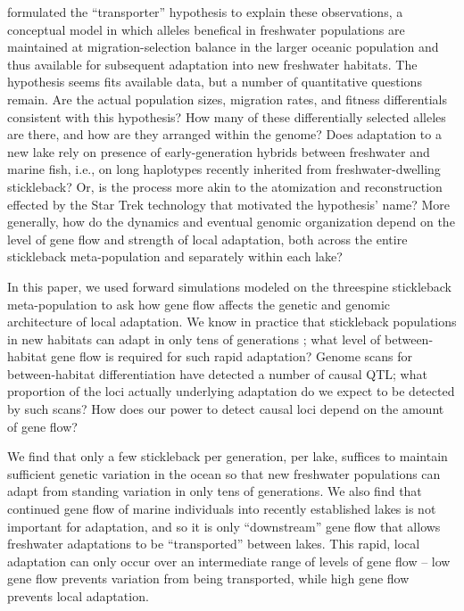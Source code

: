\documentclass{article}
\begin{document}
\citet{schluter2009genetics} formulated the ``transporter'' hypothesis to explain these observations,
a conceptual model in which alleles benefical in freshwater populations
are maintained at migration-selection balance in the larger oceanic population
and thus available for subsequent adaptation into new freshwater habitats.
The hypothesis seems fits available data,
but a number of quantitative questions remain.
Are the actual population sizes, migration rates, and fitness differentials
consistent with this hypothesis?
How many of these differentially selected alleles are there,
and how are they arranged within the genome?
Does adaptation to a new lake rely on presence of early-generation hybrids between freshwater and marine fish,
i.e., on long haplotypes recently inherited from freshwater-dwelling stickleback?
Or, is the process
more akin to the atomization and reconstruction effected by the Star Trek technology that motivated the hypothesis' name?
More generally, 
how do the dynamics and eventual genomic organization
depend on the level of gene flow and strength of local adaptation,
both across the entire stickleback meta-population
and separately within each lake?

In this paper, we used forward simulations 
modeled on the threespine stickleback meta-population
to ask how gene flow affects the genetic and genomic architecture of local adaptation.
We know in practice that stickleback populations in new habitats can adapt in only tens of generations \citep{lescak2015evolution};
what level of between-habitat gene flow is required for such rapid adaptation?
Genome scans for between-habitat differentiation have detected a number of causal QTL;
what proportion of the loci actually underlying adaptation do we expect to be detected by such scans?
How does our power to detect causal loci depend on the amount of gene flow?

We find that only a few stickleback per generation, per lake, 
suffices to maintain sufficient genetic variation in the ocean
so that new freshwater populations can adapt from standing variation in only tens of generations.
We also find that continued gene flow of marine individuals into recently established lakes
is not important for adaptation,
and so it is only ``downstream'' gene flow that allows freshwater adaptations to be ``transported'' between lakes.
This rapid, local adaptation can only occur over an intermediate range of levels of gene flow --
low gene flow prevents variation from being transported,
while high gene flow prevents local adaptation.
\end{document}
